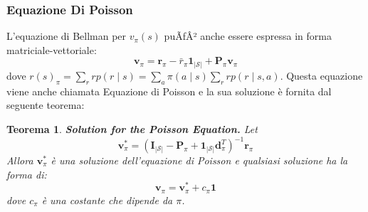 ﻿\documentclass[11pt, a4paper]{report}
\newtheorem{theorem}{Teorema}
\begin{document}
\subsubsection{Equazione Di Poisson}
L'equazione di Bellman per $v_{\pi}(s)$ puÃƒÂ² anche essere espressa in forma matriciale-vettoriale:
\begin{equation}
\bm{v}_{\pi} = \bm{r}_{\pi} - \bar{r}_{\pi} \bm{1}_{|\mathcal{S}|} + \bm{P}_{\pi} \bm{v}_{\pi}
\end{equation}
dove $r(s)_{\pi} = \sum_r r p(r \mid s) = \sum_a \pi(a \mid s) \sum_r r p(r \mid s, a)$. Questa equazione viene anche chiamata Equazione di Poisson e la sua soluzione è fornita dal seguente teorema:

\begin{theorem}
\textbf{Solution for the Poisson Equation.} Let
\begin{equation}
\bm{v}_{\pi}^* = (\bm{I}_{|\mathcal{S}|} - \bm{P}_{\pi} + \bm{1}_{|\mathcal{S}|} \bm{d}_{\pi}^T)^{-1} \bm{r}_{\pi}
\end{equation}
Allora $\bm{v}_{\pi}^*$ è una soluzione dell'equazione di Poisson e qualsiasi soluzione ha la forma di:
\begin{equation}
\bm{v}_{\pi} = \bm{v}_{\pi}^* + c_{\pi} \bm{1}
\end{equation}
dove $c_{\pi}$ è una costante che dipende da $\pi$.
\end{theorem}
\end{document}
